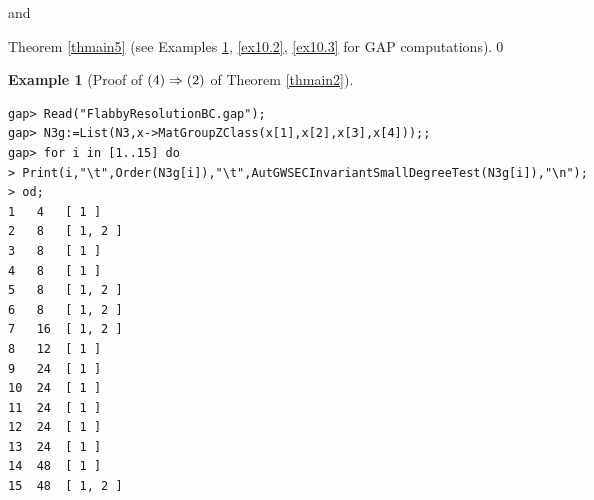 \documentclass{amsart}
\theoremstyle{plain}
\theoremstyle{definition}
\newtheorem{example}[theorem]{Example}
\theoremstyle{remark}
\begin{document}
and {Theorem \ref{thmain5} 
(see Examples \ref{ex10.1}, \ref{ex10.2}, \ref{ex10.3} for GAP computations).\qed

\bigskip
\begin{example}[{Proof of ${\rm (4)}\Rightarrow {\rm (2)}$ of {Theorem \ref{thmain2}}}]\label{ex10.1}~\vspace*{-5mm}\\
\begin{verbatim}
gap> Read("FlabbyResolutionBC.gap");
gap> N3g:=List(N3,x->MatGroupZClass(x[1],x[2],x[3],x[4]));;
gap> for i in [1..15] do
> Print(i,"\t",Order(N3g[i]),"\t",AutGWSECInvariantSmallDegreeTest(N3g[i]),"\n");
> od;
1	4	[ 1 ]
2	8	[ 1, 2 ]
3	8	[ 1 ]
4	8	[ 1 ]
5	8	[ 1, 2 ]
6	8	[ 1, 2 ]
7	16	[ 1, 2 ]
8	12	[ 1 ]
9	24	[ 1 ]
10	24	[ 1 ]
11	24	[ 1 ]
12	24	[ 1 ]
13	24	[ 1 ]
14	48	[ 1 ]
15	48	[ 1, 2 ]
\end{verbatim}
\end{example}

}
\end{document}
